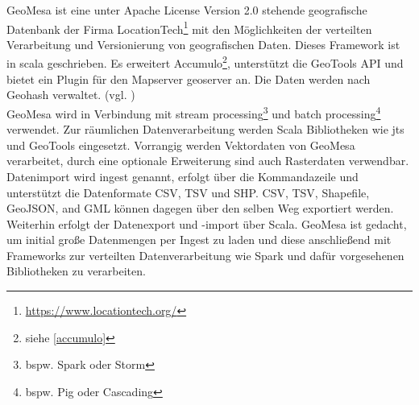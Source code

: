 GeoMesa ist eine unter Apache License Version 2.0 stehende geografische Datenbank der Firma LocationTech\footnote{\url{https://www.locationtech.org/}} mit den Möglichkeiten der verteilten Verarbeitung und Versionierung von geografischen Daten.
Dieses Framework ist in \Gls{scala} geschrieben.
Es erweitert Accumulo\footnote{siehe \ref{accumulo}}, unterstützt die GeoTools API und bietet ein Plugin für den Mapserver \Gls{geoserver} an.
Die Daten werden nach Geohash %
verwaltet. (vgl. \cite{website:geomesaeclipse})\\
GeoMesa wird in Verbindung mit stream processing\footnote{bspw. Spark oder Storm} und batch processing\footnote{bspw. Pig oder Cascading} verwendet.
Zur räumlichen Datenverarbeitung werden Scala Bibliotheken wie \Gls{jts} und GeoTools eingesetzt.
Vorrangig werden Vektordaten von GeoMesa verarbeitet, durch eine optionale Erweiterung sind auch Rasterdaten verwendbar.
Datenimport wird ingest genannt, erfolgt über die Kommandazeile und unterstützt die Datenformate CSV, TSV und SHP.
CSV, TSV, Shapefile, GeoJSON, and GML können dagegen über den selben Weg exportiert werden.
Weiterhin erfolgt der Datenexport und -import über Scala.
GeoMesa ist gedacht, um initial große Datenmengen per Ingest zu laden und diese anschließend mit Frameworks zur verteilten Datenverarbeitung wie Spark und dafür vorgesehenen Bibliotheken zu verarbeiten.
%
%
%
%





